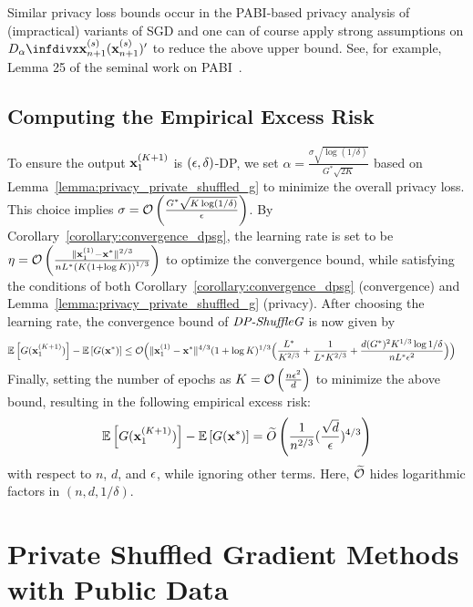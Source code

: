 Similar privacy loss bounds occur in the PABI-based privacy analysis of (impractical) variants of SGD and one can of course apply strong assumptions on $\infdivalpha{\rvx_{n+1}^{(s)}}{(\rvx_{n+1}^{(s)})'}$ to reduce the above upper bound. See, for example, Lemma 25 of the seminal work on PABI~\cite{Feldman2018privacy_amp_iter}.


\subsection{Computing the Empirical Excess Risk}
\label{subsec:appendix_private_shuffle_g_empirical_excess_risk}


To ensure the output ${\mathbf{x}}_1^{(K+1)}$ is $({\epsilon}, \delta)$-DP, we set $\alpha = \frac{\sigma \sqrt{\log(1/\delta)}}{G^{*} \sqrt{2K}}$ based on Lemma~\ref{lemma:privacy_private_shuffled_g} to minimize the overall privacy loss. This choice implies $\sigma = {\mathcal{O}}\left(\frac{G^{*} \sqrt{K \log(1/\delta)}}{{\epsilon}}\right)$.
By Corollary~\ref{corollary:convergence_dpsg}, the learning rate is set to be $\eta = {\mathcal{O}}\left(\frac{\|{\mathbf{x}}_1^{(1)} - {\mathbf{x}}^{*} \|^{2/3}}{n L^{*} \left(K (1 + \log K)\right)^{1/3}}\right)$ to optimize the convergence bound, while satisfying the conditions of both Corollary~\ref{corollary:convergence_dpsg} (convergence) and Lemma~\ref{lemma:privacy_private_shuffled_g} (privacy). After choosing the learning rate, the convergence bound of $\textit{DP-ShuffleG}$ is now given by
\begin{align*}
    \mathbb{E}\left[G({\mathbf{x}}_1^{(K+1)})\right] - \mathbb{E}\left[G({\mathbf{x}}^*)\right]
    &\leq {\mathcal{O}}\Big(\|{\mathbf{x}}_1^{(1)} - {\mathbf{x}}^*\|^{4/3} (1+\log K)^{1/3} 
    \Big( \frac{L^*}{K^{2/3}} + \frac{1}{L^* K^{2/3}} + \frac{d (G^*)^2 K^{1/3}\log 1/\delta}{n L^* {\epsilon}^2} \Big) \Big)
\end{align*}
Finally, setting the number of epochs as
$K = {\mathcal{O}}\left(\frac{n{\epsilon}^2}{d} \right)$ to minimize the above bound, resulting in
the following empirical excess risk:
\begin{align*}
    \mathbb{E}\left[G({\mathbf{x}}_1^{(K+1)})\right] - \mathbb{E}\left[G({\mathbf{x}}^*)\right]
    = \widetilde{O}\left( \frac{1}{n^{2/3}}(\frac{\sqrt{d}}{{\epsilon}})^{4/3} \right)
\end{align*}
with respect to $n$, $d$, and ${\epsilon}$, while ignoring other terms. 
Here, $\widetilde{{\mathcal{O}}}$ hides logarithmic factors in $(n, d, 1/\delta)$.






\section{Private Shuffled Gradient Methods with Public Data}
\label{sec:appendix_algo_pub_data}

